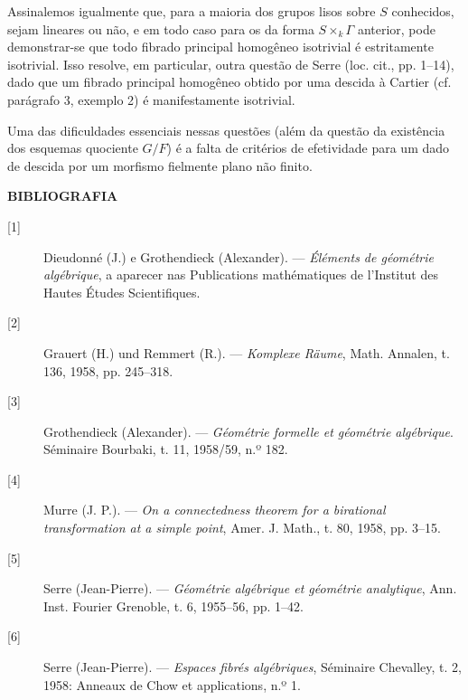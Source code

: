 Assinalemos igualmente que, para a maioria dos grupos lisos sobre $S$ conhecidos,
sejam lineares ou não, e em todo caso para os da forma
$S\times_k\Gamma$ anterior, pode demonstrar-se que todo fibrado principal
homogêneo isotrivial é estritamente isotrivial. Isso resolve, em particular,
outra questão de Serre (loc. cit., pp. 1--14), dado que um fibrado principal
homogêneo obtido por uma descida à Cartier (cf. parágrafo 3, exemplo 2) é
manifestamente isotrivial.

 Uma das dificuldades essenciais nessas questões
(além da questão da existência dos esquemas quociente $G/F$) é a
falta de critérios de efetividade para um dado de descida por um morfismo
fielmente plano não finito.

\begin{center}
  \textbf{BIBLIOGRAFIA}
\end{center}

\begin{description}
  \item[{[1]}] Dieudonné (J.) e Grothendieck (Alexander). --- \emph{Éléments
    de géométrie algébrique}, a aparecer nas Publications
    mathématiques de l'Institut des Hautes Études Scientifiques.
  \item[{[2]}] Grauert (H.) und Remmert (R.). --- \emph{Komplexe Räume}, Math.
    Annalen, t. 136, 1958, pp. 245--318.
  \item[{[3]}] Grothendieck (Alexander). --- \emph{Géométrie formelle et
    géométrie algébrique}. Séminaire Bourbaki, t. 11, 1958/59, n.º 182.
  \item[{[4]}] Murre (J. P.). --- \emph{On a connectedness theorem for a
    birational transformation at a simple point}, Amer. J. Math., t. 80, 1958,
    pp. 3--15.
  \item[{[5]}] Serre (Jean-Pierre). --- \emph{Géométrie algébrique et géométrie
    analytique}, Ann. Inst. Fourier Grenoble, t. 6, 1955--56, pp. 1--42.
  \item[{[6]}] Serre (Jean-Pierre). --- \emph{Espaces fibrés algébriques},
    Séminaire Chevalley, t. 2, 1958: Anneaux de Chow et applications, n.º 1.
\end{description}
